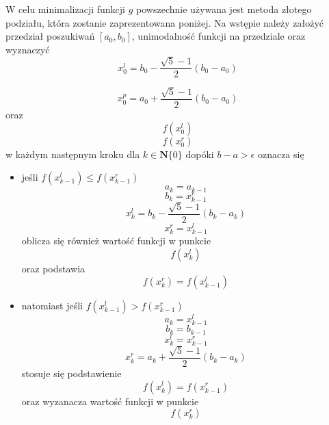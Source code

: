 W celu minimalizacji funkcji $g$ powszechnie używana jest metoda złotego podziału, która zostanie zaprezentowana poniżej. Na wstępie należy założyć przedział poszukiwań $[a_0, b_0]$, unimodalność funkcji na przedziale oraz wyznaczyć
\begin{equation}
x^l_{0} = b_0 - \frac{\sqrt{5} - 1}{2}(b_0 - a_0)
\end{equation}

\begin{equation}
x^p_{0} = a_0 + \frac{\sqrt{5} - 1}{2}(b_0 - a_0)
\end{equation}
oraz 
\begin{equation}
f(x^l_{0})
\end{equation}
\begin{equation}
f(x^r_{0})
\end{equation}
w każdym następnym kroku dla $k \in \mathbf{N}\{0\}$ dopóki $b-a > \epsilon$ oznacza się
\begin{itemize}
\item jeśli $f(x^l_{k-1}) \leq f(x^r_{k-1}) $ \newline
	\begin{equation}
	a_k = a_{k-1}
	\end{equation}
	\begin{equation}
	b_k = x^r_{k-1}
	\end{equation}
	\begin{equation}
	x^l_k = b_k - \frac{\sqrt{5} - 1}{2}(b_k - a_k)
	\end{equation}
	\begin{equation}
	x^r_k = x^l_{k-1}
	\end{equation}
	oblicza się również wartość funkcji w punkcie 
	\begin{equation}
	f(x^l_k)
	\end{equation}
	oraz podstawia
	\begin{equation}
	f(x^r_k) = f(x^l_{k-1})
	\end{equation}
\item natomiast jeśli $f(x^l_{k-1}) > f(x^r_{k-1}) $ \newline
	\begin{equation}
	a_k = x^l_{k-1}
	\end{equation}
	\begin{equation}
	b_k = b_{k-1}
	\end{equation}
	\begin{equation}
	x^l_k = x^r_{k-1}
	\end{equation}
	\begin{equation}
	x^r_k = a_k + \frac{\sqrt{5} - 1}{2}(b_k - a_k)
	\end{equation}
	stosuje się podstawienie 
	\begin{equation}
	f(x^l_k) = f(x^r_{k-1})
	\end{equation}
	oraz wyzanacza wartość funkcji w punkcie
	\begin{equation}
	f(x^r_k)
	\end{equation}
\end{itemize}
